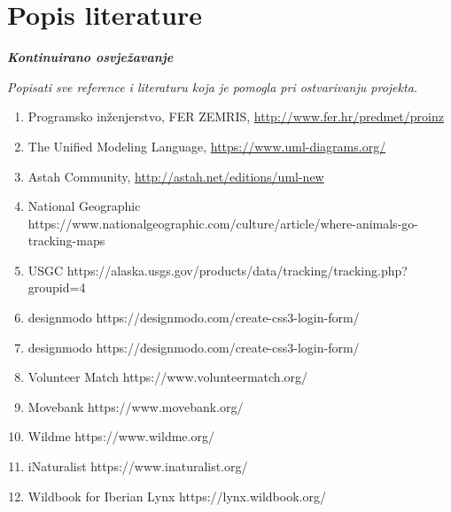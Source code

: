 \chapter*{Popis literature}
	 	
 		\textbf{\textit{Kontinuirano osvježavanje}}
	
		\textit{Popisati sve reference i literaturu koja je pomogla pri ostvarivanju projekta.}
		
		
		\begin{enumerate}
			
			
			\item  Programsko inženjerstvo, FER ZEMRIS, \url{http://www.fer.hr/predmet/proinz}
			
			
			\item  The Unified Modeling Language, \url{https://www.uml-diagrams.org/}
			
			\item  Astah Community, \url{http://astah.net/editions/uml-new}
			
			\item National Geographic https://www.nationalgeographic.com/culture/article/where-animals-go-tracking-maps
			
			\item USGC https://alaska.usgs.gov/products/data/tracking/tracking.php?groupid=4
			
			\item designmodo https://designmodo.com/create-css3-login-form/
			
			\item designmodo https://designmodo.com/create-css3-login-form/
			
			\item Volunteer Match https://www.volunteermatch.org/
			
			\item Movebank https://www.movebank.org/
			
			\item Wildme https://www.wildme.org/
			
			\item iNaturalist https://www.inaturalist.org/
			
			\item Wildbook for Iberian Lynx https://lynx.wildbook.org/
			
		\end{enumerate}
		
		 